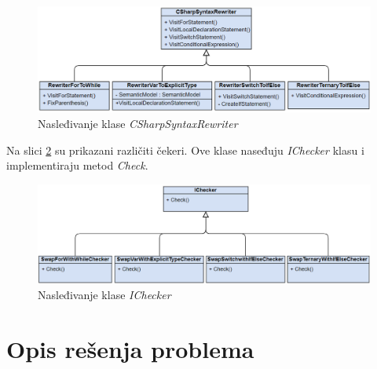 \documentclass[a4paper]{article}
\begin{document}
{\begin{figure}[h!]
\begin{center}
\includegraphics[scale=0.5]{images/CSharpSyntaxRewriter.png}
\end{center}
\caption{Nasleđivanje klase \textit{CSharpSyntaxRewriter}}
\label{fig:CSharpSyntaxRewriter}
\end{figure}

Na slici \ref{fig:IChecker} su prikazani različiti čekeri. Ove klase naseđuju \textit{IChecker} klasu i implementiraju metod \textit{Check}.

\begin{figure}[h!]
\begin{center}
\includegraphics[scale=0.5]{images/IChecker.png}
\end{center}
\caption{Nasleđivanje klase \textit{IChecker}}
\label{fig:IChecker}
\end{figure}


\section{Opis rešenja problema}
\label{sec:opis_resenja_problema}

}
\end{document}
